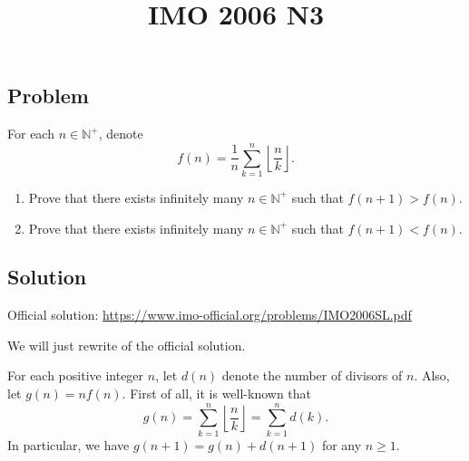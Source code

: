 \documentclass{article}
\title{IMO 2006 N3}
\author{}
\date{}
\newcommand{\N}{\mathbb{N}}
\begin{document}
\maketitle



\subsection*{Problem}

For each $n \in \N^+$, denote
\[ f(n) = \frac{1}{n} \sum_{k = 1}^n \left\lfloor \frac{n}{k} \right\rfloor. \]
\begin{enumerate}
    \item Prove that there exists infinitely many $n \in \N^+$ such that $f(n + 1) > f(n)$.
    \item Prove that there exists infinitely many $n \in \N^+$ such that $f(n + 1) < f(n)$.
\end{enumerate}



\subsection*{Solution}

Official solution: \url{https://www.imo-official.org/problems/IMO2006SL.pdf}

We will just rewrite of the official solution.

For each positive integer $n$, let $d(n)$ denote the number of divisors of $n$.
Also, let $g(n) = n f(n)$.
First of all, it is well-known that
\[ g(n) = \sum_{k = 1}^n \left\lfloor \frac{n}{k} \right\rfloor = \sum_{k = 1}^n d(k). \]
In particular, we have $g(n + 1) = g(n) + d(n + 1)$ for any $n \geq 1$.
\end{document}
